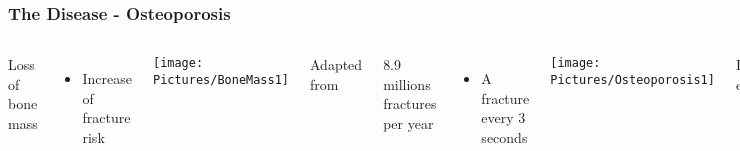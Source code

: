\documentclass[xcolor=table,11pt]{beamer}
\begin{document}
	\begin{frame}[noframenumbering]
		\frametitle{The Disease - Osteoporosis}

		\begin{columns}
			Loss of bone mass
			\begin{itemize}
				\item Increase of fracture risk \cite{p1}
			\end{itemize}

			\vspace{5mm}

			\texttt{[image: Pictures/BoneMass1]}\\
			\begin{center}
				\tiny{Adapted from \cite{p3}}
			\end{center}

			8.9 millions fractures per year \cite{p2}
			\begin{itemize}
				\item A fracture every 3 seconds
			\end{itemize}

			\vspace{5mm}

			\texttt{[image: Pictures/Osteoporosis1]}\\
			\begin{center}
				\tiny{Image from eurospinepatientline.org}
			\end{center}
		\end{columns}

	\end{frame}
\end{document}
